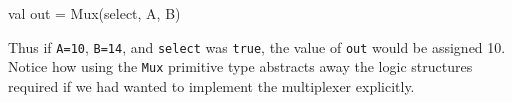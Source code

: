 \begin{scala}
val out = Mux(select, A, B)
\end{scala}

Thus if \verb+A=10+, \verb+B=14+, and \verb+select+ was \verb+true+, the value of \verb+out+ would be assigned 10. Notice how using the \verb+Mux+ primitive type abstracts away the logic structures required if we had wanted to implement the multiplexer explicitly.


%
%


%
%
%
